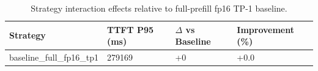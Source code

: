 \begin{table}
\caption{Strategy interaction effects relative to full-prefill fp16 TP-1 baseline.}
\label{tab:interactions}
\begin{tabular}{llll}
\toprule
Strategy & TTFT P95 (ms) & $\Delta$ vs Baseline & Improvement (\%) \\
\midrule
baseline\_full\_fp16\_tp1 & 279169 & +0 & +0.0 \\
\bottomrule
\end{tabular}
\end{table}
